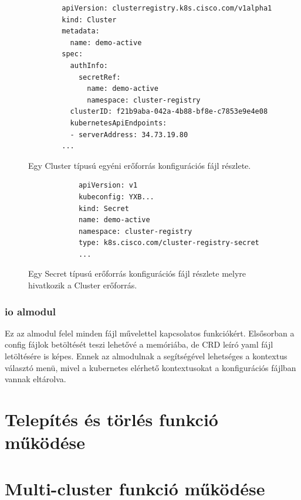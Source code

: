 \begin{figure}
    \centering
    \begin{minipage}{\linewidth}
      \begin{lstlisting}
        apiVersion: clusterregistry.k8s.cisco.com/v1alpha1
        kind: Cluster
        metadata:
          name: demo-active
        spec:
          authInfo:
            secretRef:
              name: demo-active
              namespace: cluster-registry
          clusterID: f21b9aba-042a-4b88-bf8e-c7853e9e4e08
          kubernetesApiEndpoints:
          - serverAddress: 34.73.19.80
        ...
      \end{lstlisting}
      \end{minipage}
      \caption{Egy Cluster típusú egyéni erőforrás konfigurációs fájl részlete.}
      \label{sample-cluster-config}
  \end{figure}

\begin{figure}
    \centering
    \begin{minipage}{\linewidth}
        \begin{lstlisting}
            apiVersion: v1
            kubeconfig: YXB...
            kind: Secret
            name: demo-active
            namespace: cluster-registry
            type: k8s.cisco.com/cluster-registry-secret
            ...
        \end{lstlisting}
    \end{minipage}
    \caption{Egy Secret típusú erőforrás konfigurációs fájl részlete melyre hivatkozik a Cluster erőforrás.}
      \label{sample-secret-config}
\end{figure}

\subsubsection*{io almodul}
Ez az almodul felel minden fájl művelettel kapcsolatos funkciókért.
Elsősorban a config fájlok betöltését teszi lehetővé a memóriába, de CRD leíró yaml fájl letöltésére is képes.
Ennek az almodulnak a segítségével lehetséges a kontextus választó menü, mivel a kubernetes elérhető kontextusokat a konfigurációs fájlban vannak eltárolva.

\section{Telepítés és törlés funkció működése}

\section{Multi-cluster funkció működése}

